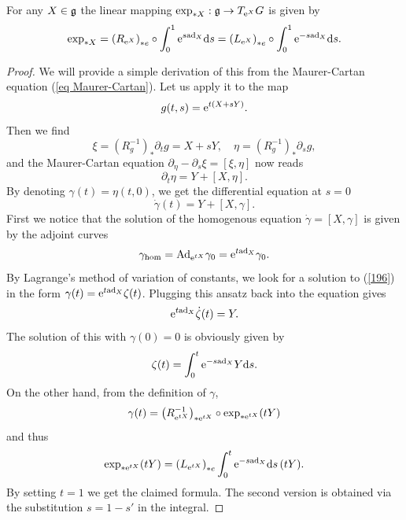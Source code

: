 \begin{thm}[{{\cite[Thm.~1.5.3]{DK}}}]\label{thm differential of exp}
    For any $X\in\mathfrak{g}$ the linear mapping $\exp_{\ast X}:\mathfrak{g}\to T_{\mathrm{e}^X} G$ is given by
    \[  \exp_{\ast X}=\left(R_{\mathrm{e}^X}\right)_{\ast e}\circ \int_0^1 \mathrm{e}^{s\mathrm{ad}_X}{\mathrm{d}} s=\left(L_{\mathrm{e}^X}\right)_{\ast e}\circ \int_0^1 \mathrm{e}^{-s\mathrm{ad}_X}{\mathrm{d}} s.   \]
\end{thm}
\begin{proof}
    We will provide a simple derivation of this from the Maurer-Cartan equation (\ref{eq Maurer-Cartan}). Let us apply it to the map
    \[g(t,s)=\mathrm{e}^{t(X+sY)}.\]
    Then we find
    \[\xi=\left(R_g^{-1}\right)_\ast \partial_t g=X+sY, \quad \eta=\left(R_g^{-1}\right)_\ast \partial_s g,\]
    and the Maurer-Cartan equation $\partial_\eta-\partial_s\xi=[\xi,\eta]$ now reads
    \[\partial_t \eta=Y+[X,\eta].\]
    By denoting $\gamma(t)=\eta(t,0)$, we get the differential equation at $s=0$
    \[\dot\gamma(t)=Y+[X,\gamma].\label{196}\]
    First we notice that the solution of the homogenous equation $\dot\gamma=[X,\gamma]$ is given by the adjoint curves
    \[\gamma_{\mathrm{hom}}=\mathrm{Ad}_{\mathrm{e}^{tX}}\gamma_0=\mathrm{e}^{t\mathrm{ad}_X}\gamma_0.\]
    By Lagrange's method of variation of constants, we look for a solution to (\ref{196}) in the form $\gamma(t)=\mathrm{e}^{t\mathrm{ad}_X}\zeta(t)$. Plugging this ansatz back into the equation gives
    \[\mathrm{e}^{t\mathrm{ad}_X}\dot\zeta(t)=Y.\]
    The solution of this with $\gamma(0)=0$ is obviously given by
    \[\zeta(t)=\int_0^t \mathrm{e}^{-s\mathrm{ad}_X}Y{\mathrm{d}} s.\]
    On the other hand, from the definition of $\gamma$,
    \[\gamma(t)=\left(R_{\mathrm{e}^{tX}}^{-1}\right)_{\ast \mathrm{e}^{tX}}\circ \exp_{\ast \mathrm{e}^{tX}}(tY)\]
    and thus
    \[\exp_{\ast \mathrm{e}^{tX}}(tY)=\left(L_{\mathrm{e}^{tX}}\right)_{\ast e}\int_0^t\mathrm{e}^{-s\mathrm{ad}_X}{\mathrm{d}} s\,(tY).\]
    By setting $t=1$ we get the claimed formula. The second version is obtained via the substitution $s=1-s'$ in the integral.
\end{proof}


